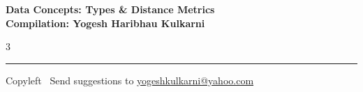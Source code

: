\documentclass[8pt,landscape]{article}
\begin{document}
\footnotesize


\begin{center}
\Large{\textbf{Data Concepts: Types \& Distance Metrics\\ Compilation: Yogesh Haribhau Kulkarni}}
\end{center}

\begin{multicols}{3}

\end{multicols}

\rule{\linewidth}{0.25pt}
\scriptsize
Copyleft \textcopyleft\  Send suggestions to
\href{http://www.yogeshkulkarni.com}{yogeshkulkarni@yahoo.com}
\end{document}

